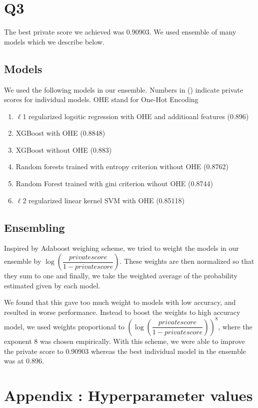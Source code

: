 \documentclass{article}
\begin{document}
\section{Q3}

The best private score we achieved was $0.90903$. We used ensemble of many models which we describe below.

\subsection{Models}
We used the following models in our ensemble. Numbers in () indicate private scores for individual models. OHE stand for One-Hot Encoding
\begin{enumerate}
	\item $\ell$1 regularized logsitic regression with OHE and additioanl features (0.896)
	\item XGBoost with OHE (0.8848)
	\item XGBoost without OHE (0.883)
	\item Random forests trained with entropy criterion without OHE (0.8762)
	\item Random Forest trained with gini criterion wihout OHE (0.8744)
	\item $\ell$2 regularized linear kernel SVM with OHE (0.85118)
\end{enumerate}

\subsection{Ensembling}

Inspired by Adaboost weighing scheme, we tried to weight the models in our ensemble by $\log \left( \dfrac{private score}{1 - private score} \right)$. These weights are then normalized so that they sum to one and finally, we take the weighted average of the probability estimated given by each model.

We found that this gave too much weight to models with low accuracy, and resulted in worse performance. Instead to boost the weights to high accuracy model, we used weights proportional to $\left( \log \left( \dfrac{private score}{1 - private score} \right) \right)^8$, where the exponent $8$ was chosen empirically. With this scheme, we were able to improve the private score to 0.90903 whereas the best individual model in the ensemble was at 0.896.


\section{Appendix : Hyperparameter values}
\label{Appendix}
\end{document}
